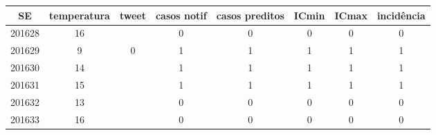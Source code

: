 \begin{tabular}{c|ccccccc}
  \hline
SE & temperatura & tweet & casos notif & casos preditos & ICmin & ICmax & incidência \\ 
  \hline
201628 & 16 &  & 0 & 0 & 0 & 0 & 0 \\ 
  201629 & 9 & 0 & 1 & 1 & 1 & 1 & 1 \\ 
  201630 & 14 &  & 1 & 1 & 1 & 1 & 1 \\ 
  201631 & 15 &  & 1 & 1 & 1 & 1 & 1 \\ 
  201632 & 13 &  & 0 & 0 & 0 & 0 & 0 \\ 
  201633 & 16 &  & 0 & 0 & 0 & 0 & 0 \\ 
   \hline
\end{tabular}

